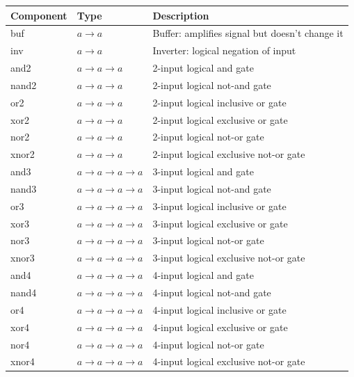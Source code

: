 \documentclass[a4paper,openany,fleqn]{book}
\begin{document}
\begin{tabular}[c]{|lll|}
\hline
Component & Type & Description \\
\hline
buf & $a \rightarrow a$
  & Buffer: amplifies signal but doesn't change it \\
inv & $a \rightarrow a$
  & Inverter: logical negation of input \\
and2 & $a \rightarrow a \rightarrow a$
  & 2-input logical and gate \\
nand2 & $a \rightarrow a \rightarrow a$
  & 2-input logical not-and gate \\
or2 & $a \rightarrow a \rightarrow a$
  & 2-input logical inclusive or gate \\
xor2 & $a \rightarrow a \rightarrow a$
  & 2-input logical exclusive or gate \\
nor2 & $a \rightarrow a \rightarrow a$
  & 2-input logical not-or gate \\
xnor2 & $a \rightarrow a \rightarrow a$
  & 2-input logical exclusive not-or gate \\
and3 & $a \rightarrow a \rightarrow a \rightarrow a$
  & 3-input logical and gate \\
nand3 & $a \rightarrow a \rightarrow a \rightarrow a$
  & 3-input logical not-and gate \\
or3 & $a \rightarrow a \rightarrow a \rightarrow a$
  & 3-input logical inclusive or gate \\
xor3 & $a \rightarrow a \rightarrow a \rightarrow a$
  & 3-input logical exclusive or gate \\
nor3 & $a \rightarrow a \rightarrow a \rightarrow a$
  & 3-input logical not-or gate \\
xnor3 & $a \rightarrow a \rightarrow a \rightarrow a$
  & 3-input logical exclusive not-or gate \\
and4 & $a \rightarrow a \rightarrow a \rightarrow a$
  & 4-input logical and gate \\
nand4 & $a \rightarrow a \rightarrow a \rightarrow a$
  & 4-input logical not-and gate \\
or4 & $a \rightarrow a \rightarrow a \rightarrow a$
  & 4-input logical inclusive or gate \\
xor4 & $a \rightarrow a \rightarrow a \rightarrow a$
  & 4-input logical exclusive or gate \\
nor4 & $a \rightarrow a \rightarrow a \rightarrow a$
  & 4-input logical not-or gate \\
xnor4 & $a \rightarrow a \rightarrow a \rightarrow a$
  & 4-input logical exclusive not-or gate \\
\hline
\end{tabular}
\end{document}
